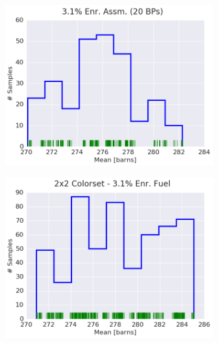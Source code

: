 \begin{figure}[h!]
\begin{subfigure}{0.5\textwidth}
  \centering
  \includegraphics[width=\linewidth]{figures/patterns/assm-3.1-20BPs/hist-kde-rug/assm-31-20BPs-fiss-2}
  \caption{}
  \label{fig:chap9-hist-assm-3.1-20BPs-fiss}
\end{subfigure}%
\begin{subfigure}{0.5\textwidth}
  \centering
  \includegraphics[width=\linewidth]{figures/patterns/2x2/hist-kde-rug/31-enr-fiss-2}
  \caption{}
  \label{fig:chap9-hist-2x2-3.1-fiss}
\end{subfigure}
\begin{subfigure}{0.5\textwidth}
  \centering

\end{subfigure}
\end{figure}
